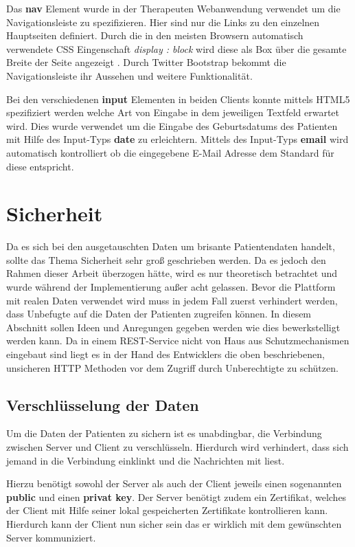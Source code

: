 Das \textbf{nav} Element wurde in der Therapeuten Webanwendung verwendet um die Navigationsleiste zu spezifizieren. Hier sind nur die Links zu den einzelnen Hauptseiten definiert. Durch die in den meisten Browsern automatisch verwendete CSS Eingenschaft \textit{display : block} wird diese als Box über die gesamte Breite der Seite angezeigt \cite{SELFHTMLD16}. Durch Twitter Bootstrap bekommt die Navigationsleiste ihr Aussehen und weitere Funktionalität.

Bei den verschiedenen \textbf{input} Elementen in beiden Clients konnte mittels HTML5 spezifiziert werden welche Art von Eingabe in dem jeweiligen Textfeld erwartet wird. Dies wurde verwendet um die Eingabe des Geburtsdatums des Patienten mit Hilfe des Input-Typs \textbf{date} zu erleichtern. Mittels des Input-Typs \textbf{email} wird automatisch kontrolliert ob die eingegebene E-Mail Adresse dem Standard für diese entspricht.

\section{Sicherheit}\label{_GrundlagenSicherheit}
Da es sich bei den ausgetauschten Daten um brisante Patientendaten handelt, sollte das Thema Sicherheit sehr groß geschrieben werden. Da es jedoch den Rahmen dieser Arbeit überzogen hätte, wird es nur theoretisch betrachtet und wurde während der Implementierung außer acht gelassen. Bevor die Plattform mit realen Daten verwendet wird muss in jedem Fall zuerst verhindert werden, dass Unbefugte auf die Daten der Patienten zugreifen können. In diesem Abschnitt sollen Ideen und Anregungen gegeben werden wie dies bewerkstelligt werden kann. 
Da in einem REST-Service nicht von Haus aus Schutzmechanismen eingebaut sind liegt es in der Hand des Entwicklers die oben beschriebenen, unsicheren HTTP Methoden vor dem Zugriff durch Unberechtigte zu schützen.

\subsection{Verschlüsselung der Daten}
Um die Daten der Patienten zu sichern ist es unabdingbar, die Verbindung zwischen Server und Client zu verschlüsseln. Hierdurch wird verhindert, dass sich jemand in die Verbindung einklinkt und die Nachrichten mit liest. 

Hierzu benötigt sowohl der Server als auch der Client jeweils einen sogenannten \textbf{public} und einen \textbf{privat key}. Der Server benötigt zudem ein Zertifikat, welches der Client mit Hilfe seiner lokal gespeicherten Zertifikate kontrollieren kann. Hierdurch kann der Client nun sicher sein das er wirklich mit dem gewünschten Server kommuniziert.

